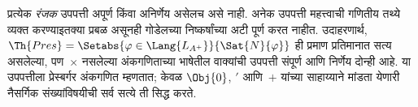 प्रत्येक \emph{रंजक} उपपत्ती अपूर्ण किंवा अनिर्णेय असेलच असे
नाही. अनेक उपपत्ती महत्त्वाची गणितीय तथ्ये व्यक्त करण्याइतक्या
प्रबळ असूनही गोडेलच्या निष्कर्षांच्या अटी पूर्ण करत नाहीत.
उदाहरणार्थ, $\Th{Pres} = \Setabs{\varphi \in \Lang{L_{A^+}}}{\Sat{N}{\varphi}}$
ही प्रमाण प्रतिमानात सत्य असलेल्या, पण~$\times$ नसलेल्या
अंकगणिताच्या भाषेतील वाक्यांची उपपत्ती संपूर्ण आणि
निर्णेय दोन्ही आहे. या उपपत्तीला प्रेस्बर्गर अंकगणित म्हणतात;
केवळ $\Obj{0}$, $\prime$ आणि~$+$ यांच्या साहाय्याने मांडता
येणारी नैसर्गिक संख्यांविषयीची सर्व सत्ये ती सिद्ध करते.



